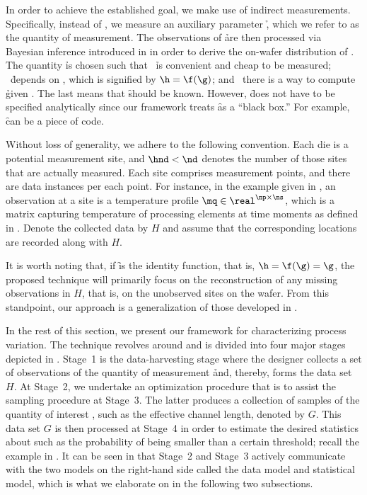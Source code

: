 In order to achieve the established goal, we make use of indirect measurements.
Specifically, instead of \g, we measure an auxiliary parameter \h, which we
refer to as the quantity of measurement. The observations of \h are then
processed via Bayesian inference introduced in  in
order to derive the on-wafer distribution of \g. The quantity \h is chosen such
that \one~\h is convenient and cheap to be measured; \two~\h depends on \g,
which is signified by $\h = \f(\g)$; and \three~there is a way to compute \h
given \g. The last means that \f should be known. However, \f does not have to
be specified analytically since our framework treats \f as a ``black box.'' For
example, \f can be a piece of code.

Without loss of generality, we adhere to the following convention. Each die is a
potential measurement site, and $\hnd < \nd$ denotes the number of those sites
that are actually measured. Each site comprises \np measurement points, and
there are \ns data instances per each point. For instance, in the example given
in , an observation at a site is a temperature profile
$\mq \in \real^{\np \times \ns}$, which is a matrix capturing temperature of \np
processing elements at \ns time moments as defined in
. Denote the collected data by $H$ and assume that the
corresponding locations are recorded along with $H$.

It is worth noting that, if \f is the identity function, that is, $\h = \f(\g) =
\g$, the proposed technique will primarily focus on the reconstruction of any
missing observations in $H$, that is, on the unobserved sites on the wafer. From
this standpoint, our approach is a generalization of those developed in
\cite{reda2009, zhang2010}.

In the rest of this section, we present our framework for characterizing process
variation. The technique revolves around  and is divided
into four major stages depicted in . Stage~1 is the
data-harvesting stage where the designer collects a set of observations of the
quantity of measurement \h and, thereby, forms the data set $H$. At Stage~2, we
undertake an optimization procedure that is to assist the sampling procedure at
Stage~3. The latter produces a collection of samples of the quantity of interest
\g, such as the effective channel length, denoted by $G$. This data set $G$ is
then processed at Stage~4 in order to estimate the desired statistics about \g
such as the probability of \g being smaller than a certain threshold; recall the
example in . It can be seen in  that
Stage~2 and Stage~3 actively communicate with the two models on the right-hand
side called the data model and statistical model, which is what we elaborate on
in the following two subsections.

